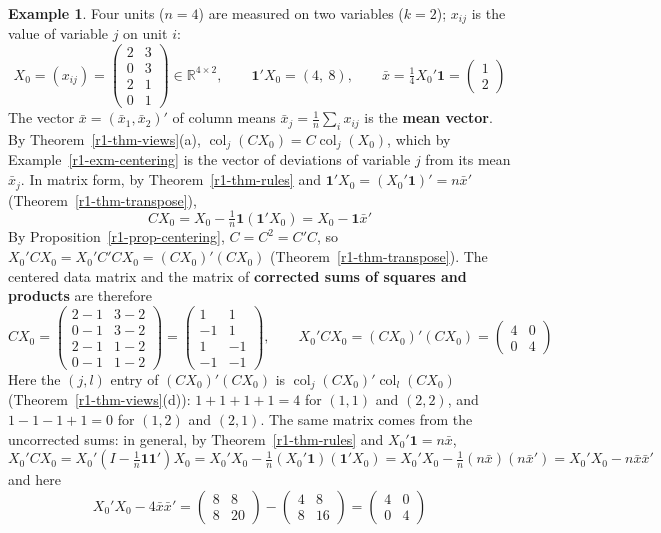 \documentclass[12pt]{article}
\newcommand{\R}{\mathbb R}
\newcommand{\one}{\mathbf 1}
\DeclareMathOperator{\col}{col}
\theoremstyle{definition}
\newtheorem{example}[theorem]{Example}
\begin{document}
\begin{example}\label{r1-exm-data}
Four units (\(n=4\)) are measured on two variables (\(k=2\)); \(x_{ij}\) is the value of
variable \(j\) on unit \(i\):
\[
X_0=(x_{ij})=\begin{pmatrix}2&3\\0&3\\2&1\\0&1\end{pmatrix}\in\R^{4\times2},\qquad
\one'X_0=(4,\ 8),\qquad
\bar x=\tfrac14X_0'\one=\begin{pmatrix}1\\2\end{pmatrix}
\]
The vector \(\bar x=(\bar x_1,\bar x_2)'\) of column means \(\bar x_j=\frac1n\sum_ix_{ij}\) is
the \textbf{mean vector}. By Theorem~\ref{r1-thm-views}(a),
\(\col_j(CX_0)=C\col_j(X_0)\), which by Example~\ref{r1-exm-centering} is the vector of
deviations of variable \(j\) from its mean \(\bar x_j\). In matrix form, by
Theorem~\ref{r1-thm-rules} and \(\one'X_0=(X_0'\one)'=n\bar x'\)
(Theorem~\ref{r1-thm-transpose}),
\[
CX_0=X_0-\tfrac1n\one(\one'X_0)=X_0-\one\bar x'
\]
By Proposition~\ref{r1-prop-centering}, \(C=C^2=C'C\), so
\(X_0'CX_0=X_0'C'CX_0=(CX_0)'(CX_0)\) (Theorem~\ref{r1-thm-transpose}). The centered data
matrix and the matrix of \textbf{corrected sums of squares and products} are therefore
\[
CX_0=\begin{pmatrix}2-1&3-2\\0-1&3-2\\2-1&1-2\\0-1&1-2\end{pmatrix}=\begin{pmatrix}1&1\\-1&1\\1&-1\\-1&-1\end{pmatrix},\qquad
X_0'CX_0=(CX_0)'(CX_0)=\begin{pmatrix}4&0\\0&4\end{pmatrix}
\]
Here the \((j,l)\) entry of \((CX_0)'(CX_0)\) is \(\col_j(CX_0)'\col_l(CX_0)\)
(Theorem~\ref{r1-thm-views}(d)): \(1+1+1+1=4\) for \((1,1)\) and \((2,2)\), and
\(1-1-1+1=0\) for \((1,2)\) and \((2,1)\). The same matrix comes from the uncorrected sums: in
general, by Theorem~\ref{r1-thm-rules} and \(X_0'\one=n\bar x\),
\[
X_0'CX_0=X_0'(I-\tfrac1n\one\one')X_0=X_0'X_0-\tfrac1n(X_0'\one)(\one'X_0)
=X_0'X_0-\tfrac1n(n\bar x)(n\bar x')=X_0'X_0-n\bar x\bar x'
\]
and here
\[
X_0'X_0-4\bar x\bar x'=\begin{pmatrix}8&8\\8&20\end{pmatrix}-\begin{pmatrix}4&8\\8&16\end{pmatrix}
=\begin{pmatrix}4&0\\0&4\end{pmatrix}
\]
\end{example}
\end{document}
